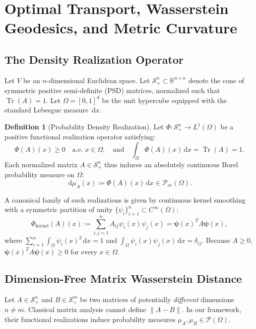 \documentclass[11pt,a4paper,reqno]{amsart}
\theoremstyle{definition}
\newtheorem{definition}[theorem]{Definition}
\numberwithin{equation}{section}
\newcommand{\R}{\mathbb{R}}
\newcommand{\Tr}{\operatorname{Tr}}
\newcommand{\dif}{\,\mathrm{d}}
\begin{document}
\section{Optimal Transport, Wasserstein Geodesics, and Metric Curvature}
\label{sec:optimal_transport}

\subsection{The Density Realization Operator}
Let $V$ be an $n$-dimensional Euclidean space. Let $\mathcal{S}_+^n \subset \R^{n \times n}$ denote the cone of symmetric positive semi-definite (PSD) matrices, normalized such that $\Tr(A) = 1$. Let $\Omega = [0, 1]^d$ be the unit hypercube equipped with the standard Lebesgue measure $\dif x$.

\begin{definition}[Probability Density Realization]
Let $\Phi \colon \mathcal{S}_+^n \to L^1(\Omega)$ be a positive functional realization operator satisfying:
\begin{equation}
    \Phi(A)(x) \ge 0 \quad \text{a.e. } x \in \Omega, \quad \text{and} \quad \int_\Omega \Phi(A)(x) \dif x = \Tr(A) = 1.
\end{equation}
Each normalized matrix $A \in \mathcal{S}_+^n$ thus induces an absolutely continuous Borel probability measure on $\Omega$:
\begin{equation}
    \dif \mu_A(x) \coloneqq \Phi(A)(x) \dif x \in \mathcal{P}_{\mathrm{ac}}(\Omega).
\end{equation}
\end{definition}

A canonical family of such realizations is given by continuous kernel smoothing with a symmetric partition of unity $\{\psi_i\}_{i=1}^n \subset C^\infty(\Omega)$:
\begin{equation}
    \Phi_{\mathrm{kernel}}(A)(x) \coloneqq \sum_{i,j=1}^n A_{ij} \psi_i(x) \psi_j(x) = \boldsymbol{\psi}(x)^T A \boldsymbol{\psi}(x),
\end{equation}
where $\sum_{i=1}^n \int_\Omega \psi_i(x)^2 \dif x = 1$ and $\int_\Omega \psi_i(x)\psi_j(x)\dif x = \delta_{ij}$. Because $A \ge 0$, $\boldsymbol{\psi}(x)^T A \boldsymbol{\psi}(x) \ge 0$ for every $x \in \Omega$.

\subsection{Dimension-Free Matrix Wasserstein Distance}
Let $A \in \mathcal{S}_+^n$ and $B \in \mathcal{S}_+^m$ be two matrices of potentially \emph{different} dimensions $n \ne m$. Classical matrix analysis cannot define $\|A - B\|$. In our framework, their functional realizations induce probability measures $\mu_A, \mu_B \in \mathcal{P}(\Omega)$.
\end{document}
